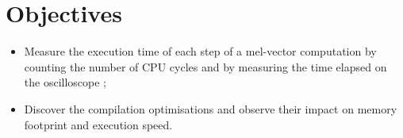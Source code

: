 \section*{Objectives}

\begin{itemize}
    \item Measure the execution time of each step of a mel-vector computation by counting the number of CPU cycles and by measuring the time elapsed on the oscilloscope ;
    \item Discover the compilation optimisations and observe their impact on memory footprint and execution speed.
\end{itemize}
